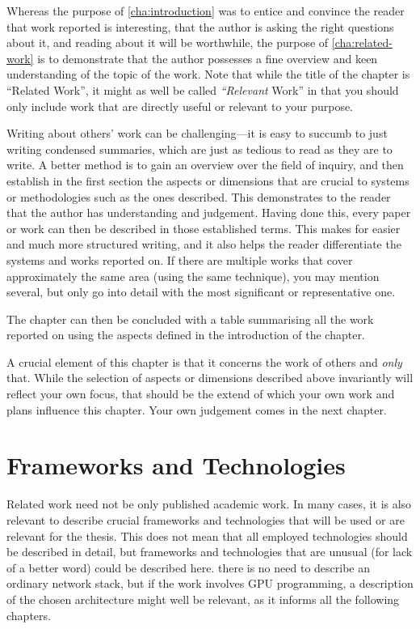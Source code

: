Whereas the purpose of \autoref{cha:introduction} was to entice and
convince the reader that work reported is interesting, that the author
is asking the right questions about it, and reading about it will be
worthwhile, the purpose of \autoref{cha:related-work} is to
demonstrate that the author possesses a fine overview and keen
understanding of the topic of the work.  Note that while the title of
the chapter is ``Related Work'', it might as well be called
\emph{``Relevant} Work'' in that you should only include work that are
directly useful or relevant to your purpose. 

Writing about others' work can be challenging---it is easy to succumb
to just writing condensed summaries, which are just as tedious to read
as they are to write. A better method is to gain an overview over the
field of inquiry, and then establish in the first section the aspects
or dimensions that are crucial to systems or methodologies such as the
ones described. This demonstrates to the reader that the author has
understanding and judgement. Having done this, every paper or work can
then be described in those established terms. This makes for easier
and much more structured writing, and it also helps the reader
differentiate the systems and works reported on. If there are multiple
works that cover approximately the same area (\eg using the same
technique), you may mention several, but only go into detail with the
most significant or representative one.

The chapter can then be concluded with a table summarising all the
work reported on using the aspects defined in the introduction of the
chapter.

A crucial element of this chapter is that it concerns the work of
others and \emph{only} that. While the selection of aspects or
dimensions described above invariantly will reflect your own focus,
that should be the extend of which your own work and plans influence
this chapter.  Your own judgement comes in the next chapter.

\section{Frameworks and Technologies}
\label{sec:fram-techn}

Related work need not be only published academic work. In many cases,
it is also relevant to describe crucial frameworks and technologies
that will be used or are relevant for the thesis.  This does not mean
that all employed technologies should be described in detail, but
frameworks and technologies that are unusual (for lack of a better
word) could be described here. \Eg there is no need to describe an
ordinary network stack, but if the work involves GPU programming, a
description of the chosen architecture might well be relevant, as it
informs all the following chapters.


